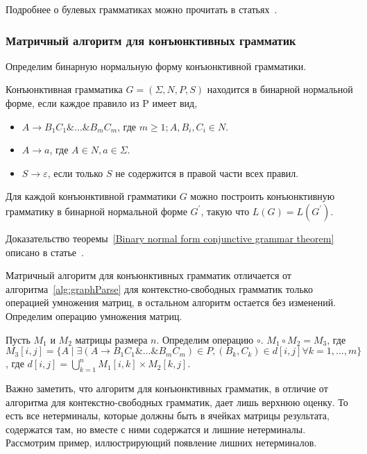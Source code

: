 Подробнее о булевых грамматиках можно прочитать в статьях~\cite{Okhotin:2003:BG:1758089.1758123,Okhotin:2014:PMM:2565359.2565379}.

\subsubsection{Матричный алгоритм для конъюнктивных грамматик}

Определим бинарную нормальную форму конъюнктивной грамматики.
\begin{definition}
    Конъюнктивная грамматика $G = (\Sigma, N, P, S)$ находится в бинарной нормальной форме, если каждое правило из P имеет вид,
    \begin{itemize}
		\item $A \rightarrow B_1 C_1 \& \ldots\& B_m C_m$, где $m \geqslant 1; A,B_i,C_i \in N$.
		\item $A \rightarrow a$, где $A \in N, a \in \Sigma$.
		\item $S \rightarrow \varepsilon$, если только $S$ не содержится в правой части всех правил.
	\end{itemize}
\end{definition}

\begin{theorem}\label{Binary normal form conjunctive grammar theorem}
    Для каждой конъюнктивной грамматики $G$ можно построить конъюнктивную грамматику в бинарной нормальной форме $G^{'}$, такую что $L(G) = L(G^{'})$.
\end{theorem}
Доказательство теоремы~\ref{Binary normal form conjunctive grammar theorem} описано в статье~\cite{DBLP:journals/jalc/Okhotin01}.

Матричный алгоритм для конъюнктивных грамматик отличается от алгоритма~\ref{alg:graphParse} для контекстно-свободных грамматик только операцией умножения матриц, в остальном алгоритм остается без изменений. Определим операцию умножения матриц.
\begin{definition}
    Пусть $M_1$ и $M_2$ матрицы размера $n$. Определим операцию $\circ$. $M_1 \circ M_2 = M_3$, где $M_3 [i,j] = \{A \mid \exists (A \rightarrow B_1 C_1 \& \ldots \& B_m C_m) \in P, (B_k , C_k) \in d[i,j] \forall k = 1,\ldots,m\}$, где $d[i,j] = \bigcup_{k = 1}^{n} M_1 [i,k] \times M_2 [k,j]$.
\end{definition}

Важно заметить, что алгоритм для конъюнктивных грамматик, в отличие от алгоритма для контекстно-свободных грамматик, дает лишь верхнюю оценку. То есть все нетерминалы, которые должны быть в ячейках матрицы результата, содержатся там, но вместе с ними содержатся и лишние нетерминалы. Рассмотрим пример, иллюстрирующий появление лишних нетерминалов.

